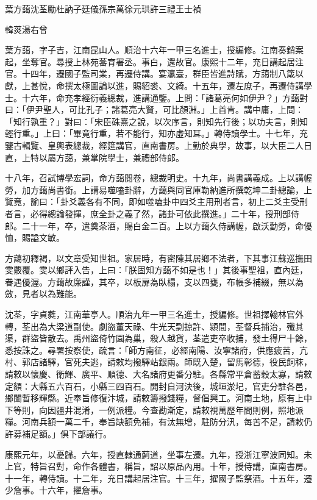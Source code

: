 
\begin{pinyinscope}
葉方藹沈荃勵杜訥子廷儀孫宗萬徐元珙許三禮王士禎

韓菼湯右曾

葉方藹，字子吉，江南昆山人。順治十六年一甲三名進士，授編修。江南奏銷案起，坐奪官。尋授上林苑蕃育署丞。事白，還故官。康熙十二年，充日講起居注官。十四年，遷國子監司業，再遷侍講。宴瀛臺，群臣皆進詩賦，方藹制八箴以獻，上甚悅，命撰太極圖論以進，賜貂裘、文綺。十五年，遷左庶子，再遷侍講學士。十六年，命充孝經衍義總裁，進講通鑒。上問：「諸葛亮何如伊尹？」方藹對曰：「伊尹聖人，可比孔子；諸葛亮大賢，可比顏淵。」上首肯。講中庸，上問：「知行孰重？」對曰：「宋臣硃熹之說，以次序言，則知先行後；以功夫言，則知輕行重。」上曰：「畢竟行重，若不能行，知亦虛知耳。」轉侍讀學士。十七年，充鑒古輯覽、皇輿表總裁，經筵講官，直南書房。上勤於典學，故事，以大臣二人日直，上特以屬方藹，兼掌院學士，兼禮部侍郎。

十八年，召試博學宏詞，命方藹閱卷，總裁明史。十九年，尚書講義成。上以講幄勞，加方藹尚書銜。上講易噬嗑卦辭，方藹與同官庫勒納進所撰乾坤二卦總論，上覽竟，諭曰：「卦爻義各有不同，即如噬嗑卦中四爻主用刑者言，初上二爻主受刑者言，必得總論發揮，庶全卦之義了然，諸卦可依此撰進。」二十年，授刑部侍郎。二十一年，卒，遣奠茶酒，賜白金二百。上以方藹久侍講幄，啟沃勤勞，命優恤，賜謚文敏。

方藹初釋褐，以文章受知世祖。家居時，有密陳其居鄉不法者，下其事江蘇巡撫田雯覈覆。雯以鄉評入告，上曰：「朕固知方藹不如是也！」其後事聖祖，直內廷，眷遇優渥。方藹故廉謹，其卒，以板扉為臥榻，支以四甕，布帳多補綴，無以為斂，見者以為難能。

沈荃，字貞蕤，江南華亭人。順治九年一甲三名進士，授編修。世祖擇翰林官外轉，荃出為大梁道副使。劇盜董天祿、牛光天剽掠許、潁間，荃督兵捕治，殲其渠，群盜皆散去。禹州盜倚竹園為巢，殺人越貨，荃遣吏卒收捕，發土得尸十餘，悉按誅之。尋署按察使，疏言：「師方南征，必經南陽、汝寧諸府，供應疲苦，亢村、郭店諸驛，官死夫逃，請敕均撥驛站銀兩。師既入楚，留馬彰德，役民飼秣，請敕以懷慶、衛輝、廣平、順德、大名諸府更番分駐。各縣常平倉蓄穀太寡，請敕定額：大縣五六百石，小縣三四百石。開封自河決後，城垣淤圮，官吏分駐各邑，鄉闈暫移輝縣。近奉旨修復汴城，請敕籌撥錢糧，督倡興工。河南土地，原有上中下等則，向因疆井混淆，一例派糧。今查勘漸定，請敕視萬歷年間則例，照地派糧。河南兵額一萬二千，奉旨缺額免補，有汰無增，駐防分汛，每苦不足，請敕仍許募補足額。」俱下部議行。

康熙元年，以憂歸。六年，授直隸通薊道，坐事左遷。九年，授浙江寧波同知。未上官，特旨召對，命作各體書，稱旨，詔以原品內用。十年，授侍講，直南書房。十一年，轉侍讀。十二年，充日講起居注官。十三年，擢國子監祭酒。十五年，遷少詹事。十六年，擢詹事。


\end{pinyinscope}
